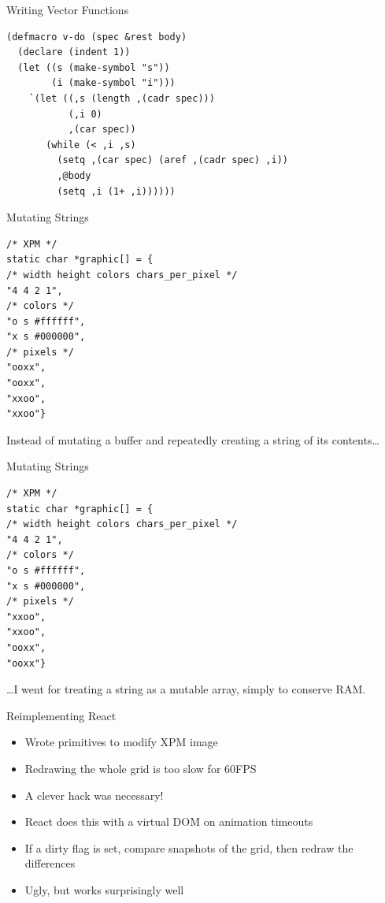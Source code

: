 \documentclass[presentation]{beamer}
\begin{document}
\begin{frame}[fragile,label=sec-4-6]{Writing Vector Functions}
 \begin{verbatim}
(defmacro v-do (spec &rest body)
  (declare (indent 1))
  (let ((s (make-symbol "s"))
        (i (make-symbol "i")))
    `(let ((,s (length ,(cadr spec)))
           (,i 0)
           ,(car spec))
       (while (< ,i ,s)
         (setq ,(car spec) (aref ,(cadr spec) ,i))
         ,@body
         (setq ,i (1+ ,i))))))
\end{verbatim}
\end{frame}

\begin{frame}[fragile,label=sec-4-7]{Mutating Strings}
 \begin{verbatim}
/* XPM */
static char *graphic[] = {
/* width height colors chars_per_pixel */
"4 4 2 1",
/* colors */
"o s #ffffff",
"x s #000000",
/* pixels */
"ooxx",
"ooxx",
"xxoo",
"xxoo"}
\end{verbatim}

Instead of mutating a buffer and repeatedly creating a string of its
contents\ldots{}
\end{frame}

\begin{frame}[fragile,label=sec-4-8]{Mutating Strings}
 \begin{verbatim}
/* XPM */
static char *graphic[] = {
/* width height colors chars_per_pixel */
"4 4 2 1",
/* colors */
"o s #ffffff",
"x s #000000",
/* pixels */
"xxoo",
"xxoo",
"ooxx",
"ooxx"}
\end{verbatim}

\ldots{}I went for treating a string as a mutable array, simply to conserve RAM.
\end{frame}

\begin{frame}[label=sec-4-9]{Reimplementing React}
\begin{itemize}
\item Wrote primitives to modify XPM image
\item Redrawing the whole grid is too slow for 60FPS
\item A clever hack was necessary!
\item React does this with a virtual DOM on animation timeouts
\item If a dirty flag is set, compare snapshots of the grid, then redraw
the differences
\item Ugly, but works surprisingly well
\end{itemize}
\end{frame}
\end{document}

